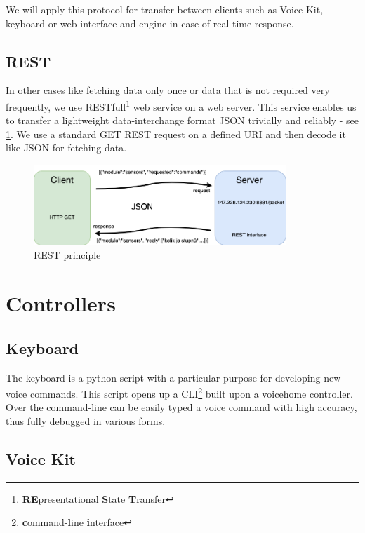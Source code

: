 We will apply this protocol for transfer between clients such as Voice Kit, keyboard or web interface and engine in case of real-time response.

\subsection{REST}

In other cases like fetching data only once or data that is not required very frequently, we use RESTfull\footnote{\textbf{R}\textbf{E}presentational \textbf{S}tate \textbf{T}ransfer} web service on a web server. This service enables us to transfer a lightweight data-interchange format JSON trivially and reliably - see \cref{fig:REST_schema}. We use a standard GET REST request on a defined URI and then decode it like JSON for fetching data.

\begin{figure}[H]
  \centering
  \includegraphics[width=0.85\textwidth]{img/REST_schema.png}
  \caption{REST principle}
  \label{fig:REST_schema}
\end{figure}

\section{Controllers}

\subsection{Keyboard}

The keyboard is a python script with a particular purpose for developing new voice commands. This script opens up a CLI\footnote{\textbf{c}ommand-\textbf{l}ine \textbf{i}nterface} built upon a voicehome controller. Over the command-line can be easily typed a voice command with high accuracy, thus fully debugged in various forms.

\subsection{Voice Kit}

